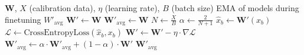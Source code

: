 \documentclass[../main.tex]{subfiles}
\begin{document}
\begin{algorithm}[H]
\caption{Gradient-Aware Adaptive Rounding (Finetuning)}\label{alg:gradient_aware_adaround_finetuning}
\begin{algorithmic}[1]
\Require $\mathbf{W}$, $X$ (calibration data), $\eta$ (learning rate), $B$ (batch size)
\Ensure EMA of models during finetuning $W'_{\text{avg}}$
\State $\mathbf{W}' \gets \mathbf{W}$
\State $\mathbf{W}'_{\text{avg}} \gets \mathbf{W}$
\State $N \gets \frac{X}{B}$ 
\State $\alpha \gets \frac{2}{N+1}$ 
    \State $\hat{x}_b \gets \mathbf{W}'(x_b)$ 
    \State $\mathcal{L} \gets \text{CrossEntropyLoss}(\hat{x}_b, x_b)$
    \State $\mathbf{W}' \gets \mathbf{W}' - \eta \cdot \nabla \mathcal{L}$ 
    \State $\mathbf{W}'_{\text{avg}} \gets \alpha \cdot \mathbf{W}'_{\text{avg}} + (1 - \alpha) \cdot \mathbf{W}'$ 
\EndFor
\State \Return $\mathbf{W}'_{\text{avg}}$
\end{algorithmic}
\end{algorithm}
\end{document}
